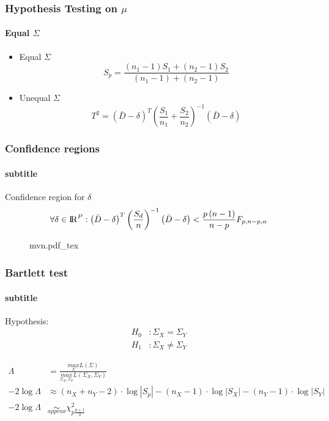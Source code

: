 \documentclass[aspectratio=169,10pt,t]{beamer}
\begin{document}
\begin{frame}[t]
	\frametitle{Hypothesis Testing on $\mu$}
	\framesubtitle{Equal $\Sigma$}
	\begin{itemize}
		\item Equal $\Sigma$\\
			\[
				S_p = 
				\frac{  \left( n_1 -1  \right) S_1 +  \left( n_2 -1  \right) S_2}
				{ \left( n_1 -1  \right) +  \left( n_2 -1  \right) } 
			\] 
		\item Unequal $\Sigma$
			\[
				T^{2} =
				\left( \bar{D} - \delta  \right) ^{T}
				\left( \frac{S_1}{n_1} + \frac{S_2}{n_2}  \right) ^{-1}
				\left( \bar{D} - \delta  \right)
			\] 
	\end{itemize}
\end{frame}
\begin{frame}[t]
	\frametitle{Confidence regions}
	\framesubtitle{subtitle}
	Confidence region for $\delta$
	\[
		\forall \delta \in {\rm I\!R}^{P}:
		\left( \bar{D} - \delta  \right) ^{T}
		\left( \frac{S_d}{n}  \right) ^{-1}
		\left( \bar{D} - \delta  \right)
		<
		\frac{p  \left( n-1 \right) }{n-p} 
		F_{p,n-p,\alpha}
	\] 
	\begin{figure}[h]
		\centering
		{mvn.pdf_tex}
	\end{figure}
\end{frame}

\begin{frame}[t]
	\frametitle{Bartlett test}
	\framesubtitle{subtitle}
	Hypothesis:
	\[
		\begin{aligned}
			H_0 &: \Sigma_X = \Sigma_Y\\
			H_1 &: \Sigma_X \neq \Sigma_Y
		\end{aligned}
	\] 

	\[
		\begin{aligned}
			\Lambda &= \frac{
				\underset{\Sigma}{max}L \left( \Sigma \right) 
				}{
				\underset{\Sigma_X,\Sigma_Y}{max}L  \left( \Sigma_X,\Sigma_Y  \right) 
			} \\
			-2 \log  \Lambda
	&\approx
	\left( n_{X} + n_{Y} -2  \right) \cdot \log  |S_{p}| 
	-  \left( n_{X} -1  \right) \cdot \log |S_{X}|
	-  \left( n_{Y} -1  \right) \cdot \log |S_{Y}|\\
	-2 \log  \Lambda
	& \underset{approx}{\sim}
	\chi^{2}_{p \frac{p+1}{2} }
	\end{aligned}
\] 

\end{frame}
\end{document}
